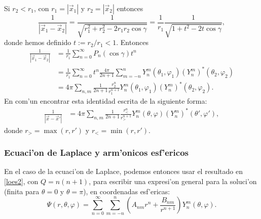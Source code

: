 Si $r_2<r_1$, con $r_1=\left|\vec{x}_1\right|$ y $r_2=\left|\vec{x}_2\right|$ entonces
\begin{equation}
\frac{1}{\left|\vec{x}_1-\vec{x}_2\right|} = \frac{1}{\sqrt{r_1^2+r_2^2-2r_1r_2\cos\gamma}} = \frac{1}{r_1}\frac{1}{\sqrt{1+t^2-2t\cos\gamma}},
\end{equation}
donde hemos definido $t:=r_2/r_1 <1$. Entonces
\begin{align}
\frac{1}{\left|\vec{x}_1-\vec{x}_2\right|} &= \frac{1}{r_1}\sum_{n=0}^\infty P_n(\cos\gamma)t^n \\
&= \frac{1}{r_1}\sum_{n=0}^\infty t^n\frac{4\pi}{2n+1} \sum_{m=-n}^n Y_n^m(\theta_1,\varphi_1)(Y_n^{m})^\ast(\theta_2,\varphi_2)  \\
&= 4\pi \sum_{n,m}\frac{1}{2n+1}\frac{r_2^n}{r_1^{n+1}} Y_n^m(\theta_1,\varphi_1)(Y_n^{m})^\ast(\theta_2,\varphi_2).
\end{align}
En com'un encontrar esta identidad escrita de la siguiente forma:
\begin{align}
\frac{1}{\left|\vec{x}-\vec{x}'\right|} 
&= 4\pi \sum_{n,m}\frac{1}{2n+1}\frac{r_<^n}{r_>^{n+1}}Y_n^m(\theta,\varphi)(Y_n^{m})^\ast(\theta',\varphi'),
\end{align}
donde $r_> = \max(r,r')$ y $r_< = \min(r,r')$.

\subsubsection{Ecuaci'on de Laplace y arm'onicos esf'ericos}
En el caso de la ecuaci'on de Laplace, podemos entonces usar el resultado en \eqref{loes2}, con $Q=n(n+1)$, para escribir una expresi'on general para la soluci'on (finita para $\theta=0$ y $\theta=\pi$), en coordenadas esf'ericas:
\begin{equation}
\Psi(r,\theta,\varphi)=\sum_{n=0}^\infty\sum_{m=-n}^n\left(A_{nm}r^n+\frac{B_{nm}}{r^{n+1}}\right)Y_n^m(\theta,\varphi).
\end{equation}